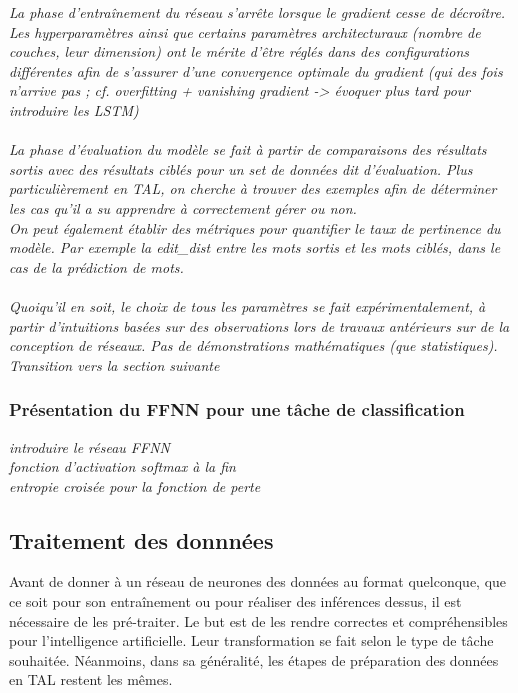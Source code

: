 \documentclass[12pt, french, twoside]{report}
\begin{document}
\textit{
    La phase d'entraînement du réseau s'arrête lorsque le gradient cesse de décroître.\\
    Les hyperparamètres ainsi que certains paramètres architecturaux (nombre de couches, leur dimension) ont le mérite d'être réglés dans des configurations différentes afin de s'assurer d'une convergence optimale du gradient (qui des fois n'arrive pas ; cf. overfitting + vanishing gradient -> évoquer plus tard pour introduire les LSTM)\\
    \\
    La phase d'évaluation du modèle se fait à partir de comparaisons des résultats sortis avec des résultats ciblés pour un set de données dit d'évaluation. Plus particulièrement en TAL, on cherche à trouver des exemples afin de déterminer les cas qu'il a su apprendre à correctement gérer ou non.\\
    On peut également établir des métriques pour quantifier le taux de pertinence du modèle.
    Par exemple la \gls{edit_dist} entre les mots sortis et les mots ciblés, dans le cas de la prédiction de mots.\\
    \\
    Quoiqu'il en soit, le choix de tous les paramètres se fait expérimentalement, à partir d'intuitions basées sur des observations lors de travaux antérieurs sur de la conception de réseaux. Pas de démonstrations mathématiques (que statistiques).\\
    Transition vers la section suivante
    }

\subsubsection{Présentation du FFNN pour une tâche de classification}
\textit{introduire le réseau FFNN\\
    fonction d'activation softmax à la fin\\
    entropie croisée pour la fonction de perte\\
    }
\subsection{Traitement des donnnées}

Avant de donner à un réseau de neurones des données au format quelconque, que ce soit pour son entraînement ou pour réaliser des inférences dessus, il est nécessaire de les pré-traiter. Le but est de les rendre correctes et compréhensibles pour l'intelligence artificielle. Leur transformation se fait selon le type de tâche souhaitée. Néanmoins, dans sa généralité, les étapes de préparation des données en TAL restent les mêmes.\\
\end{document}
